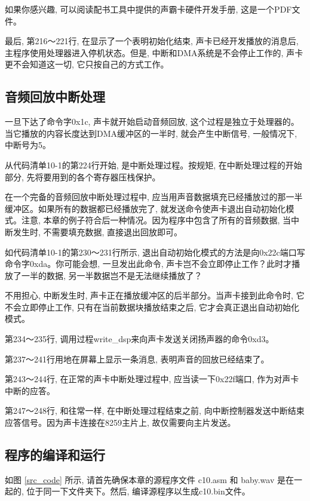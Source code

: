 \documentclass[12pt]{article}
\begin{document}
\begin{CJK}{UTF8}{gbsn}
如果你感兴趣, 可以阅读配书工具中提供的声霸卡硬件开发手册, 这是一个PDF文件。

最后, 第216～221行, 在显示了一个表明初始化结束, 声卡已经开发播放的消息后, 主程序使用处理器进入停机状态。但是, 中断和DMA系统是不会停止工作的, 声卡更不会知道这一切, 它只按自己的方式工作。

\subsection{音频回放中断处理}
一旦下达了命令字0x1c, 声卡就开始启动音频回放, 这个过程是独立于处理器的。当它播放的内容长度达到DMA缓冲区的一半时, 就会产生中断信号, 一般情况下, 中断号为5。

从代码清单10-1的第224行开始, 是中断处理过程。按规矩, 在中断处理过程的开始部分, 先将要用到的各个寄存器压栈保护。

在一个完备的音频回放中断处理过程中, 应当用声音数据填充已经播放过的那一半缓冲区。如果所有的数据都已经播放完了, 就发送命令使声卡退出自动初始化模式。注意, 本章的例子符合后一种情况。因为程序中包含了所有的音频数据, 当中断发生时, 不需要填充数据, 直接退出回放即可。

如代码清单10-1的第230～231行所示, 退出自动初始化模式的方法是向0x22c端口写命令字0xda。你可能会想, 一旦发出此命令, 声卡岂不会立即停止工作？此时才播放了一半的数据, 另一半数据岂不是无法继续播放了？

不用担心, 中断发生时, 声卡正在播放缓冲区的后半部分。当声卡接到此命令时, 它不会立即停止工作, 只有在当前数据块播放结束之后, 它才会真正退出自动初始化模式。

第234～235行, 调用过程write\_{}dsp来向声卡发送关闭扬声器的命令0xd3。

第237～241行用地在屏幕上显示一条消息, 表明声音的回放已经结束了。

第243～244行, 在正常的声卡中断处理过程中, 应当读一下0x22f端口, 作为对声卡中断的应答。

第247～248行, 和往常一样, 在中断处理过程结束之前, 向中断控制器发送中断结束应答信号。因为声卡连接在8259主片上, 故仅需要向主片发送。

\subsection{程序的编译和运行}

如图 \ref{src_code} 所示, 请首先确保本章的源程序文件 c10.asm 和 baby.wav
是在一起的, 位于同一下文件夹下。然后, 编译源程序以生成c10.bin文件。
 

\end{CJK}
\end{document}

